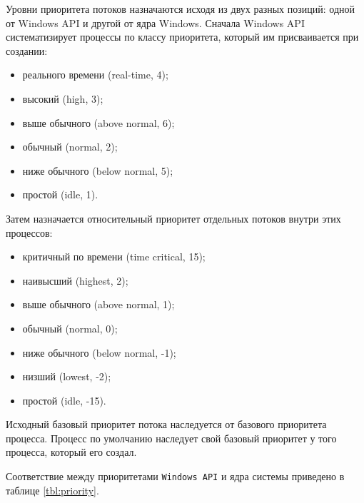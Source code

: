 Уровни приоритета потоков назначаются исходя из двух разных позиций:
одной от Windows API и другой от ядра Windows. Сначала Windows API
систематизирует процессы по классу приоритета, который им присваивается при создании:
\begin{itemize}
    \item реального времени (real-time, 4);
    \item высокий (high, 3);
    \item выше обычного (above normal, 6);
    \item обычный (normal, 2);
    \item ниже обычного (below normal, 5);
    \item простой (idle, 1).
\end{itemize}

Затем назначается относительный приоритет отдельных потоков внутри этих процессов:

\begin{itemize}
    \item критичный по времени (time critical, 15);
    \item наивысший (highest, 2);
    \item выше обычного (above normal, 1);
    \item обычный (normal, 0);
    \item ниже обычного (below normal, -1);
    \item низший (lowest, -2);
    \item простой (idle, -15).
\end{itemize}

Исходный базовый приоритет потока наследуется от базового приоритета процесса. Процесс по умолчанию наследует свой базовый приоритет у того процесса, который его создал.

Соответствие между приоритетами \texttt{Windows API} и ядра системы приведено в таблице \ref{tbl:priority}.

